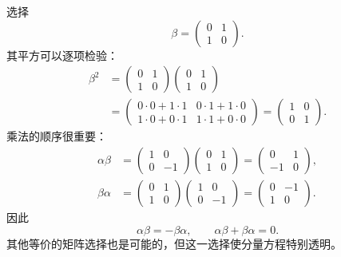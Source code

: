 选择
\begin{equation}
\beta=
\begin{pmatrix}
0&1\\
1&0
\end{pmatrix}.
\end{equation}
其平方可以逐项检验：
\begin{equation}
\begin{aligned}
\beta^2
&=
\begin{pmatrix}
0&1\\
1&0
\end{pmatrix}
\begin{pmatrix}
0&1\\
1&0
\end{pmatrix}\\
&=
\begin{pmatrix}
0\cdot0+1\cdot1&0\cdot1+1\cdot0\\
1\cdot0+0\cdot1&1\cdot1+0\cdot0
\end{pmatrix}
=
\begin{pmatrix}
1&0\\
0&1
\end{pmatrix}.
\end{aligned}
\end{equation}
乘法的顺序很重要：
\begin{align}
\alpha\beta
&=
\begin{pmatrix}
1&0\\
0&-1
\end{pmatrix}
\begin{pmatrix}
0&1\\
1&0
\end{pmatrix}
=
\begin{pmatrix}
0&1\\
-1&0
\end{pmatrix},\\
\beta\alpha
&=
\begin{pmatrix}
0&1\\
1&0
\end{pmatrix}
\begin{pmatrix}
1&0\\
0&-1
\end{pmatrix}
=
\begin{pmatrix}
0&-1\\
1&0
\end{pmatrix}.
\end{align}
因此
\begin{equation}
\alpha\beta=-\beta\alpha,
\qquad
\alpha\beta+\beta\alpha=0.
\end{equation}
其他等价的矩阵选择也是可能的，但这一选择使分量方程特别透明。

